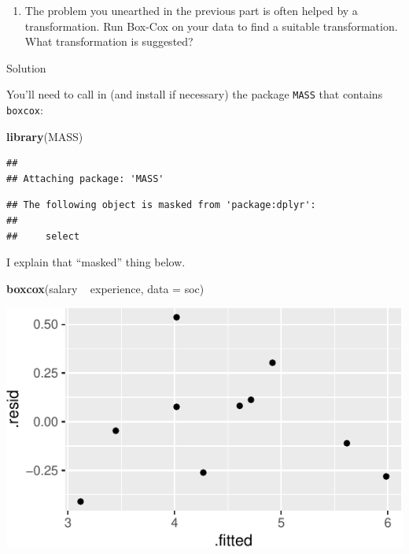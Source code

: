 \documentclass[]{tufte-book}
\newenvironment{Shaded}{}{}
\newcommand{\DataTypeTok}[1]{\textcolor[rgb]{0.56,0.13,0.00}{#1}}
\newcommand{\KeywordTok}[1]{\textcolor[rgb]{0.00,0.44,0.13}{\textbf{#1}}}
\newcommand{\NormalTok}[1]{#1}
\newcommand{\OperatorTok}[1]{\textcolor[rgb]{0.40,0.40,0.40}{#1}}
\newcommand{\StringTok}[1]{\textcolor[rgb]{0.25,0.44,0.63}{#1}}
\providecommand{\tightlist}{%
  \setlength{\itemsep}{0pt}\setlength{\parskip}{0pt}}
\theoremstyle{definition}
\theoremstyle{definition}
\theoremstyle{definition}
\theoremstyle{remark}
\begin{document}
\begin{enumerate}
\def\labelenumi{(\alph{enumi})}
\setcounter{enumi}{4}
\tightlist
\item
  The problem you unearthed in the previous part is often helped by a
  transformation. Run Box-Cox on your data to find a suitable
  transformation. What transformation is suggested?
\end{enumerate}

Solution

You'll need to call in (and install if necessary) the package
\texttt{MASS} that contains \texttt{boxcox}:

\begin{Shaded}
\begin{Highlighting}[]
\KeywordTok{library}\NormalTok{(MASS)}
\end{Highlighting}
\end{Shaded}

\begin{verbatim}
## 
## Attaching package: 'MASS'
\end{verbatim}

\begin{verbatim}
## The following object is masked from 'package:dplyr':
## 
##     select
\end{verbatim}

I explain that ``masked'' thing below.

\begin{Shaded}
\begin{Highlighting}[]
\KeywordTok{boxcox}\NormalTok{(salary }\OperatorTok{~}\StringTok{ }\NormalTok{experience, }\DataTypeTok{data =}\NormalTok{ soc)}
\end{Highlighting}
\end{Shaded}

\includegraphics{12-regression_files/figure-latex/unnamed-chunk-95-1}
\end{document}
